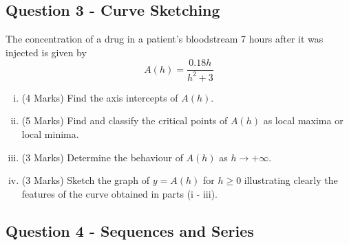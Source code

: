 \documentclass[a4paper,12pt]{article}
\begin{document}
\subsection*{Question 3 - Curve Sketching}
The concentration of a drug in a patient's bloodstream 7 hours
after it was injected is given by
\[ A(h) = \frac{0.18h}{h^2 + 3} \]
	
	\bigskip
\begin{enumerate}[(i)]
\item (4 Marks) Find the axis intercepts of $A(h)$.
	
	\bigskip
\item (5 Marks) Find and classify the critical points of $A(h)$ as local maxima or
local minima.
	
	\bigskip
\item (3 Marks) Determine the behaviour of $A(h)$ as $h \rightarrow + \infty$.
	
	\bigskip
	\item (3 Marks) Sketch the graph of $y = A(h)$ for $h \geq 0$ illustrating clearly
the features of the curve obtained in parts (i - iii).
	
	

\end{enumerate}


\newpage
\subsection*{Question 4 - Sequences and Series}

\end{document}
